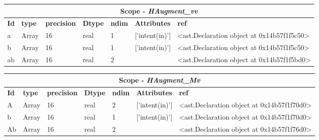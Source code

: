 \documentclass{report}
\begin{document}
 \vspace{1cm}

\begin{center}
\begin{longtable}{|p{3.5cm}|p{1.5cm}|p{1.5cm}|p{1.5cm}|p{1cm}|p{2cm}|p{4cm}| }
\hline
\multicolumn{7}{|c|}{\textbf{Scope} -  \textbf{\textit{HAugment\_vv}}} \\ 
\hline
\textbf{Id} & \textbf{type} & \textbf{precision} & \textbf{Dtype} & \textbf{ndim} & \textbf{Attributes} & \textbf{ref} \\\hline

a & Array & 16 & real & 1 & ['intent(in)'] & <ast.Declaration object at 0x14b57f1f5c50> \\\hline

b & Array & 16 & real & 1 & ['intent(in)'] & <ast.Declaration object at 0x14b57f1f5c50> \\\hline

ab & Array & 16 & real & 2 &  & <ast.Declaration object at 0x14b57f1f5bd0> \\\hline

\end{longtable}
\end{center}

 \vspace{1cm}

\begin{center}
\begin{longtable}{|p{3.5cm}|p{1.5cm}|p{1.5cm}|p{1.5cm}|p{1cm}|p{2cm}|p{4cm}| }
\hline
\multicolumn{7}{|c|}{\textbf{Scope} -  \textbf{\textit{HAugment\_Mv}}} \\ 
\hline
\textbf{Id} & \textbf{type} & \textbf{precision} & \textbf{Dtype} & \textbf{ndim} & \textbf{Attributes} & \textbf{ref} \\\hline

A & Array & 16 & real & 2 & ['intent(in)'] & <ast.Declaration object at 0x14b57f1f70d0> \\\hline

b & Array & 16 & real & 1 & ['intent(in)'] & <ast.Declaration object at 0x14b57f1f70d0> \\\hline

Ab & Array & 16 & real & 2 &  & <ast.Declaration object at 0x14b57f1f76d0> \\\hline

\end{longtable}
\end{center}

 \vspace{1cm}
\end{document}
